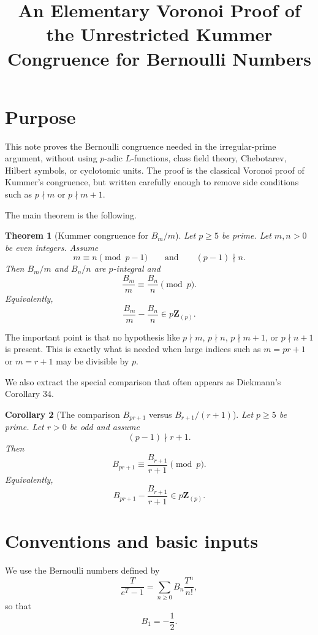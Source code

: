 \documentclass[11pt]{article}
\title{An Elementary Voronoi Proof of the Unrestricted Kummer Congruence for Bernoulli Numbers}
\author{}
\date{}
\newtheorem{theorem}{Theorem}[section]
\newtheorem{corollary}[theorem]{Corollary}
\newcommand{\Z}{\mathbf Z}
\newcommand{\Bern}{B}
\begin{document}
\maketitle

\section*{Purpose}

This note proves the Bernoulli congruence needed in the irregular-prime
argument, without using $p$-adic $L$-functions, class field theory,
Chebotarev, Hilbert symbols, or cyclotomic units.  The proof is the classical
Voronoi proof of Kummer's congruence, but written carefully enough to remove
side conditions such as $p\nmid m$ or $p\nmid m+1$.

The main theorem is the following.

\begin{theorem}[Kummer congruence for $\Bern_m/m$]\label{thm:kummer}
Let $p\ge 5$ be prime.  Let $m,n>0$ be even integers.  Assume
\[
  m\equiv n \pmod {p-1}
  \qquad\text{and}\qquad
  (p-1)\nmid n.
\]
Then $\Bern_m/m$ and $\Bern_n/n$ are $p$-integral and
\[
  \frac{\Bern_m}{m}\equiv \frac{\Bern_n}{n}\pmod p.
\]
Equivalently,
\[
  \frac{\Bern_m}{m}-\frac{\Bern_n}{n}\in p\Z_{(p)}.
\]
\end{theorem}

The important point is that no hypothesis like $p\nmid m$, $p\nmid n$,
$p\nmid m+1$, or $p\nmid n+1$ is present.  This is exactly what is needed when
large indices such as $m=p r+1$ or $m=r+1$ may be divisible by $p$.

We also extract the special comparison that often appears as Diekmann's
Corollary 34.

\begin{corollary}[The comparison $\Bern_{pr+1}$ versus $\Bern_{r+1}/(r+1)$]
\label{cor:pr-plus-one}
Let $p\ge 5$ be prime.  Let $r>0$ be odd and assume
\[
  (p-1)\nmid r+1.
\]
Then
\[
  \Bern_{pr+1}\equiv \frac{\Bern_{r+1}}{r+1}\pmod p.
\]
Equivalently,
\[
  \Bern_{pr+1}-\frac{\Bern_{r+1}}{r+1}\in p\Z_{(p)}.
\]
\end{corollary}

\section{Conventions and basic inputs}

We use the Bernoulli numbers defined by
\[
  \frac{T}{e^T-1}=\sum_{n\ge 0}\Bern_n\frac{T^n}{n!},
\]
so that
\[
  \Bern_1=-\frac12.
\]
\end{document}
